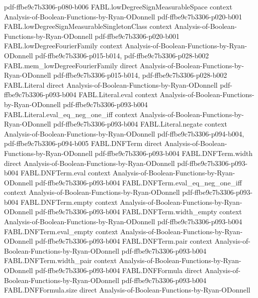 \begin{theorem}
{    pdf-ffbe9c7b3306-p080-b006}
\proofstep
  {FABL.lowDegreeSignMeasurableSpace}
  {context}
  {Analysis-of-Boolean-Functions-by-Ryan-ODonnell}
  {pdf-ffbe9c7b3306-p020-b001}
\proofstep
  {FABL.lowDegreeSignMeasurableSingletonClass}
  {context}
  {Analysis-of-Boolean-Functions-by-Ryan-ODonnell}
  {pdf-ffbe9c7b3306-p020-b001}
\proofstep
  {FABL.lowDegreeFourierFamily}
  {context}
  {Analysis-of-Boolean-Functions-by-Ryan-ODonnell}
  {pdf-ffbe9c7b3306-p015-b014,
    pdf-ffbe9c7b3306-p028-b002}
\proofstep
  {FABL.mem_lowDegreeFourierFamily}
  {direct}
  {Analysis-of-Boolean-Functions-by-Ryan-ODonnell}
  {pdf-ffbe9c7b3306-p015-b014,
    pdf-ffbe9c7b3306-p028-b002}
\proofstep
  {FABL.Literal}
  {direct}
  {Analysis-of-Boolean-Functions-by-Ryan-ODonnell}
  {pdf-ffbe9c7b3306-p093-b004}
\proofstep
  {FABL.Literal.eval}
  {context}
  {Analysis-of-Boolean-Functions-by-Ryan-ODonnell}
  {pdf-ffbe9c7b3306-p093-b004}
\proofstep
  {FABL.Literal.eval_eq_neg_one_iff}
  {context}
  {Analysis-of-Boolean-Functions-by-Ryan-ODonnell}
  {pdf-ffbe9c7b3306-p093-b004}
\proofstep
  {FABL.Literal.negate}
  {context}
  {Analysis-of-Boolean-Functions-by-Ryan-ODonnell}
  {pdf-ffbe9c7b3306-p094-b004,
    pdf-ffbe9c7b3306-p094-b005}
\proofstep
  {FABL.DNFTerm}
  {direct}
  {Analysis-of-Boolean-Functions-by-Ryan-ODonnell}
  {pdf-ffbe9c7b3306-p093-b004}
\proofstep
  {FABL.DNFTerm.width}
  {direct}
  {Analysis-of-Boolean-Functions-by-Ryan-ODonnell}
  {pdf-ffbe9c7b3306-p093-b004}
\proofstep
  {FABL.DNFTerm.eval}
  {context}
  {Analysis-of-Boolean-Functions-by-Ryan-ODonnell}
  {pdf-ffbe9c7b3306-p093-b004}
\proofstep
  {FABL.DNFTerm.eval_eq_neg_one_iff}
  {context}
  {Analysis-of-Boolean-Functions-by-Ryan-ODonnell}
  {pdf-ffbe9c7b3306-p093-b004}
\proofstep
  {FABL.DNFTerm.empty}
  {context}
  {Analysis-of-Boolean-Functions-by-Ryan-ODonnell}
  {pdf-ffbe9c7b3306-p093-b004}
\proofstep
  {FABL.DNFTerm.width_empty}
  {context}
  {Analysis-of-Boolean-Functions-by-Ryan-ODonnell}
  {pdf-ffbe9c7b3306-p093-b004}
\proofstep
  {FABL.DNFTerm.eval_empty}
  {context}
  {Analysis-of-Boolean-Functions-by-Ryan-ODonnell}
  {pdf-ffbe9c7b3306-p093-b004}
\proofstep
  {FABL.DNFTerm.pair}
  {context}
  {Analysis-of-Boolean-Functions-by-Ryan-ODonnell}
  {pdf-ffbe9c7b3306-p093-b004}
\proofstep
  {FABL.DNFTerm.width_pair}
  {context}
  {Analysis-of-Boolean-Functions-by-Ryan-ODonnell}
  {pdf-ffbe9c7b3306-p093-b004}
\proofstep
  {FABL.DNFFormula}
  {direct}
  {Analysis-of-Boolean-Functions-by-Ryan-ODonnell}
  {pdf-ffbe9c7b3306-p093-b004}
\proofstep
  {FABL.DNFFormula.size}
  {direct}
  {Analysis-of-Boolean-Functions-by-Ryan-ODonnell}

\end{theorem}

